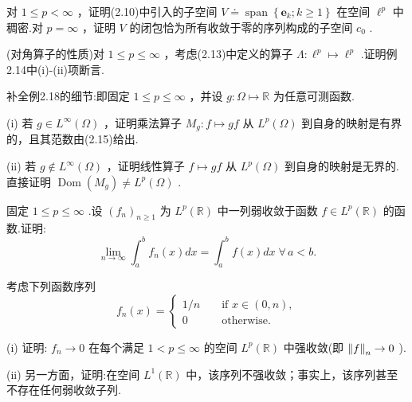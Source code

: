 \begin{rbhw}
对 $1 \leq  p < \infty$ ，证明(2.10)中引入的子空间 $V \doteq  \operatorname{span}\left\{  {{\bm{e}}_{k};k \geq  1}\right\}$ 在空间 ${\ell }^{p}$ 中稠密.对 $p = \infty$ ，证明 $V$ 的闭包恰为所有收敛于零的序列构成的子空间 ${c}_{0}$ .
\end{rbhw}

\begin{rbhw}
(对角算子的性质)对 $1 \leq  p \leq  \infty$ ，考虑(2.13)中定义的算子 $\Lambda  : {\ell }^{p} \mapsto  {\ell }^{p}$ .证明例2.14中(i)-(ii)项断言.
\end{rbhw}

\begin{rbhw}
补全例2.18的细节:即固定 $1 \leq  p \leq  \infty$ ，并设 $g : \Omega  \mapsto  \mathbb{R}$ 为任意可测函数.

(i) 若 $g \in  {L}^{\infty }\left( \Omega \right)$ ，证明乘法算子 ${M}_{g} : f \mapsto  {gf}$ 从 ${L}^{p}\left( \Omega \right)$ 到自身的映射是有界的，且其范数由(2.15)给出.

(ii) 若 $g \notin  {L}^{\infty }\left( \Omega \right)$ ，证明线性算子 $f \mapsto  {gf}$ 从 ${L}^{p}\left( \Omega \right)$ 到自身的映射是无界的.直接证明 $\operatorname{Dom}\left( {M}_{g}\right)  \neq  {L}^{p}\left( \Omega \right)$ .
\end{rbhw}

\begin{rbhw}
固定 $1 \leq  p \leq  \infty$ .设 ${\left( {f}_{n}\right) }_{n \geq  1}$ 为 ${L}^{p}\left( \mathbb{R}\right)$ 中一列弱收敛于函数 $f \in  {L}^{p}\left( \mathbb{R}\right)$ 的函数.证明:
\[
\mathop{\lim }\limits_{{n \rightarrow  \infty }}{\int }_{a}^{b}{f}_{n}\left( x\right) {dx} = {\int }_{a}^{b}f\left( x\right) {dx}\;\forall\,a < b.
\]
\end{rbhw}

\begin{rbhw}
考虑下列函数序列
\[
{f}_{n}\left( x\right)  = \left\{  \begin{matrix} 1/n & & \text{ if }x \in  \left(  {0,n}\right)  , \\  0 & & \text{ otherwise. } \end{matrix}\right.
\]

(i) 证明: ${f}_{n} \rightarrow  0$ 在每个满足 $1 < p \leq  \infty$ 的空间 ${L}^{p}\left( \mathbb{R}\right)$ 中强收敛(即 $\norm{f}_{n} \rightarrow  0$ ).

(ii) 另一方面，证明:在空间 ${L}^{1}\left( \mathbb{R}\right)$ 中，该序列不强收敛；事实上，该序列甚至不存在任何弱收敛子列.
\end{rbhw}


